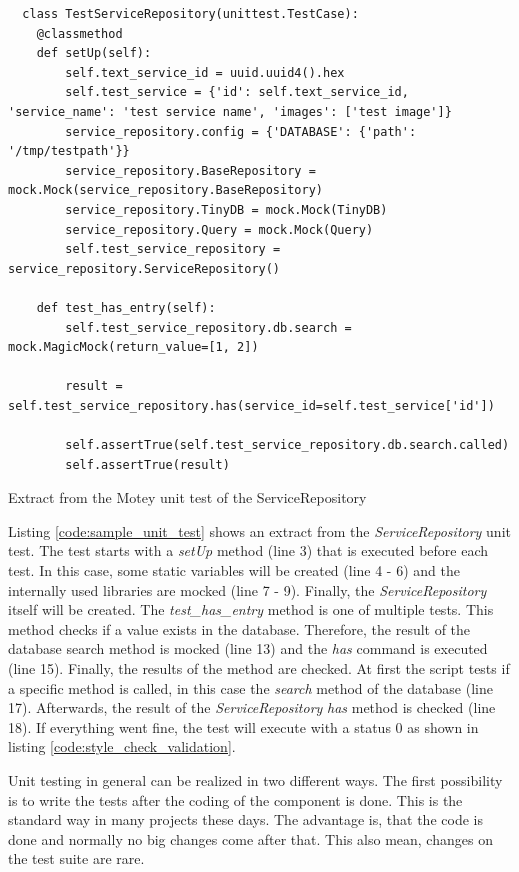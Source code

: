 \begin{listing}[H]
  \begin{verbatim}
  class TestServiceRepository(unittest.TestCase):
    @classmethod
    def setUp(self):
        self.text_service_id = uuid.uuid4().hex
        self.test_service = {'id': self.text_service_id, 'service_name': 'test service name', 'images': ['test image']}
        service_repository.config = {'DATABASE': {'path': '/tmp/testpath'}}
        service_repository.BaseRepository = mock.Mock(service_repository.BaseRepository)
        service_repository.TinyDB = mock.Mock(TinyDB)
        service_repository.Query = mock.Mock(Query)
        self.test_service_repository = service_repository.ServiceRepository()

    def test_has_entry(self):
        self.test_service_repository.db.search = mock.MagicMock(return_value=[1, 2])

        result = self.test_service_repository.has(service_id=self.test_service['id'])

        self.assertTrue(self.test_service_repository.db.search.called)
        self.assertTrue(result)
  \end{verbatim}
  \caption{Extract from the Motey unit test of the ServiceRepository}
  \label{code:sample_unit_test}
\end{listing}

Listing \ref{code:sample_unit_test} shows an extract from the \textit{ServiceRepository} unit test.
The test starts with a \textit{setUp} method (line 3) that is executed before each test.
In this case, some static variables will be created (line 4 - 6) and the internally used libraries are mocked (line 7 - 9).
Finally, the \textit{ServiceRepository} itself will be created.
The \textit{test\_has\_entry} method is one of multiple tests.
This method checks if a value exists in the database.
Therefore, the result of the database search method is mocked (line 13) and the \textit{has} command is executed (line 15).
Finally, the results of the method are checked.
At first the script tests if a specific method is called, in this case the \textit{search} method of the database (line 17).
Afterwards, the result of the \textit{ServiceRepository} \textit{has} method is checked (line 18).
If everything went fine, the test will execute with a status 0 as shown in listing \ref{code:style_check_validation}.\newline

Unit testing in general can be realized in two different ways.
The first possibility is to write the tests after the coding of the component is done.
This is the standard way in many projects these days.
The advantage is, that the code is done and normally no big changes come after that.
This also mean, changes on the test suite are rare.\newline


